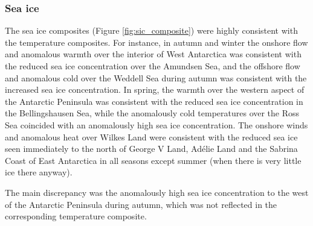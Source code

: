 \subsubsection{Sea ice}

The sea ice composites (Figure \ref{fig:sic_composite}) were highly consistent with the temperature composites. For instance, in autumn and winter the onshore flow and anomalous warmth over the interior of West Antarctica was consistent with the reduced sea ice concentration over the Amundsen Sea, and the offshore flow and anomalous cold over the Weddell Sea during autumn was consistent with the increased sea ice concentration. In spring, the warmth over the western aspect of the Antarctic Peninsula was consistent with the reduced sea ice concentration in the Bellingshausen Sea, while the anomalously cold temperatures over the Ross Sea coincided with an anomalously high sea ice concentration. The onshore winds and anomalous heat over Wilkes Land were consistent with the reduced sea ice seen immediately to the north of George V Land, Ad{\'e}lie Land and the Sabrina Coast of East Antarctica in all seasons except summer (when there is very little ice there anyway).

The main discrepancy was the anomalously high sea ice concentration to the west of the Antarctic Peninsula during autumn, which was not reflected in the corresponding temperature composite.